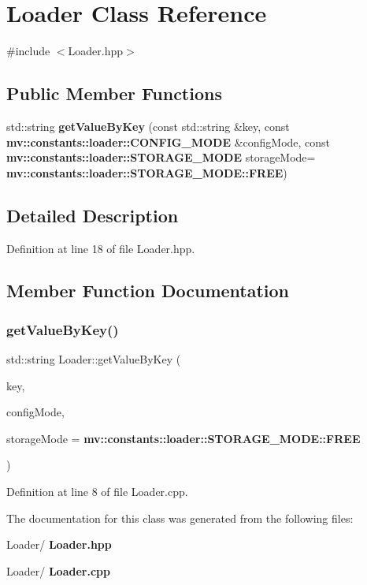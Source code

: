 \section{Loader Class Reference}
\label{class_loader}


{\ttfamily \#include $<$Loader.\+hpp$>$}

\subsection*{Public Member Functions}
\begin{DoxyCompactItemize}
\item 
std\+::string \textbf{ get\+Value\+By\+Key} (const std\+::string \&key, const \textbf{ mv\+::constants\+::loader\+::\+C\+O\+N\+F\+I\+G\+\_\+\+M\+O\+DE} \&config\+Mode, const \textbf{ mv\+::constants\+::loader\+::\+S\+T\+O\+R\+A\+G\+E\+\_\+\+M\+O\+DE} storage\+Mode=\textbf{ mv\+::constants\+::loader\+::\+S\+T\+O\+R\+A\+G\+E\+\_\+\+M\+O\+D\+E\+::\+F\+R\+EE})
\end{DoxyCompactItemize}


\subsection{Detailed Description}


Definition at line 18 of file Loader.\+hpp.



\subsection{Member Function Documentation}
\mbox{\label{class_loader_a329d5d7c7b5e8811729747a7126580d1}} 
\subsubsection{get\+Value\+By\+Key()}
{\footnotesize\ttfamily std\+::string Loader\+::get\+Value\+By\+Key (\begin{DoxyParamCaption}\item[{const std\+::string \&}]{key,  }\item[{const \textbf{ mv\+::constants\+::loader\+::\+C\+O\+N\+F\+I\+G\+\_\+\+M\+O\+DE} \&}]{config\+Mode,  }\item[{const \textbf{ mv\+::constants\+::loader\+::\+S\+T\+O\+R\+A\+G\+E\+\_\+\+M\+O\+DE}}]{storage\+Mode = {\ttfamily \textbf{ mv\+::constants\+::loader\+::\+S\+T\+O\+R\+A\+G\+E\+\_\+\+M\+O\+D\+E\+::\+F\+R\+EE}} }\end{DoxyParamCaption})}



Definition at line 8 of file Loader.\+cpp.



The documentation for this class was generated from the following files\+:\begin{DoxyCompactItemize}
\item 
Loader/\textbf{ Loader.\+hpp}\item 
Loader/\textbf{ Loader.\+cpp}\end{DoxyCompactItemize}
